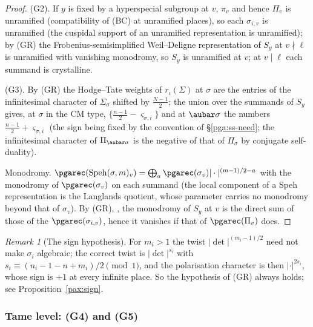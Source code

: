 \documentclass[10pt]{amsart}
\theoremstyle{definition}
\theoremstyle{remark}
\newtheorem{remark}[theorem]{Remark}
\begin{document}
\begin{proof}
(G2). If $y$ is fixed by a hyperspecial subgroup at $v$, $\pi_v$ and hence $\Pi_v$ is unramified
(compatibility of (BC) at unramified places), so each $\sigma_{i,v}$ is unramified (the cuspidal
support of an unramified representation is unramified); by (GR) the Frobenius-semisimplified
Weil--Deligne representation of $S_y$ at $v\nmid\ell$ is unramified with vanishing monodromy, so
$S_y$ is unramified at $v$; at $v\mid\ell$ each summand is crystalline.

(G3). By (GR) the Hodge--Tate weights of $r_\iota(\Sigma)$ at $\sigma$ are the entries of the
infinitesimal character of $\Sigma_\sigma$ shifted by $\frac{N-1}2$; the union over the summands
of $S_y$ gives, at $\sigma$ in the CM type, $\{\frac{n-1}2-\varsigma_{\sigma,i}\}$ and at
$\aubar\sigma$ the numbers $\frac{n-1}2+\varsigma_{\sigma,i}$ (the sign being fixed by the
convention of \S\ref{pga:ss-need}; the infinitesimal character of $\Pi_{\aubar\sigma}$ is the
negative of that of $\Pi_\sigma$ by conjugate self-duality).

Monodromy. $\pgarec(\operatorname{Speh}(\sigma,m)_v)=\bigoplus_a\pgarec(\sigma_v)|\cdot|^{(m-1)/2-a}$
with the monodromy of $\pgarec(\sigma_v)$ on each summand (the local component of a Speh
representation is the Langlands quotient, whose parameter carries no monodromy beyond that of
$\sigma_v$). By (GR), \cite[Thm.~2.1.1(2)]{BLGGT}, the monodromy of $S_y$ at $v$ is the direct sum of those of
the $\pgarec(\sigma_{i,v})$, hence it vanishes if that of $\pgarec(\Pi_v)$ does.
\end{proof}

\begin{remark}[The sign hypothesis]\label{pga:sign}
For $m_i>1$ the twist $|\det|^{(m_i-1)/2}$ need not make $\sigma_i$ algebraic; the correct twist is
$|\det|^{s_i}$ with $s_i\equiv(n_i-1-n+m_i)/2\pmod1$, and the polarisation character is then
$|\cdot|^{2s_i}$, whose sign is $+1$ at every infinite place. So the hypothesis of (GR) always holds;
see Proposition~\ref{pax:sign}.
\end{remark}

\subsubsection{Tame level: (G4) and (G5)}\label{pga:ss-local}
\end{document}
